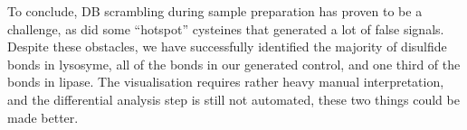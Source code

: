 To conclude, DB scrambling during sample preparation has proven to be a challenge, as did some ``hotspot'' cysteines that generated a lot of false signals. Despite these obstacles, we have successfully identified the majority of disulfide bonds in lysosyme, all of the bonds in our generated control, and one third of the bonds in lipase. The visualisation requires rather heavy manual interpretation, and the differential analysis step is still not automated, these two things could be made better.

